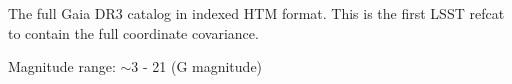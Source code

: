 The full Gaia DR3 catalog in indexed HTM format. This is the first LSST refcat to contain the full coordinate covariance.

Magnitude range: $\sim$3 - 21 (G magnitude)







